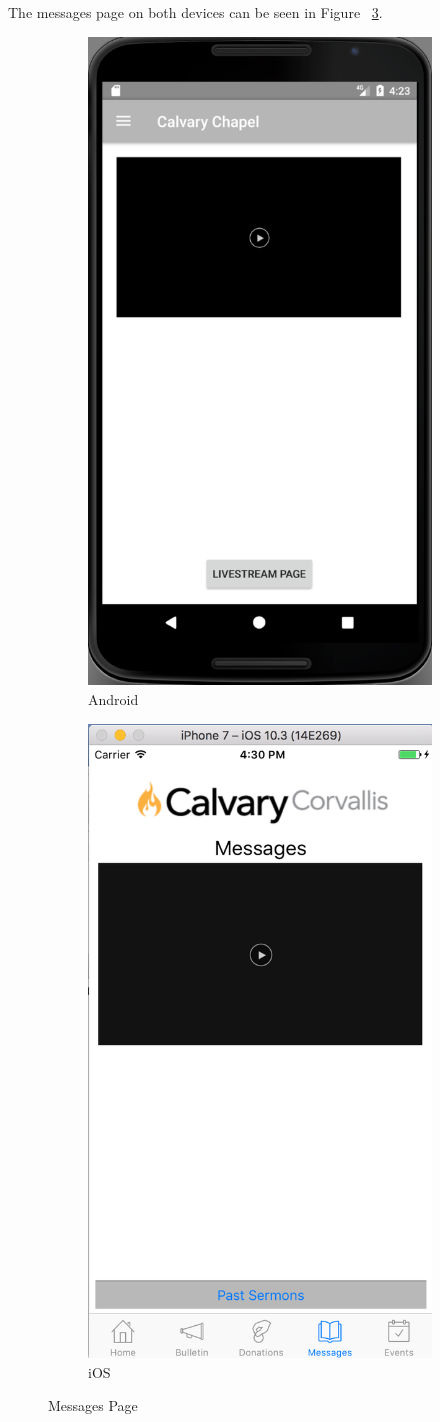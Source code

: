\documentclass[letterpaper,10pt,draftclsnofoot,onecolumn,titlepage]{IEEEtran}
\begin{document}
		The messages page on both devices can be seen in Figure ~\ref{fig:message}.
		
		\begin{figure}[H]
			\centering
			\begin{subfigure}{.5\textwidth}
 				 \centering
  				 \includegraphics[width=.4\linewidth]{androidmessages}
 				 \caption{Android}
  				 \label{fig:sub1}
			\end{subfigure}%
			\begin{subfigure}{.5\textwidth}
		         	\centering
 				 \includegraphics[width=.4\linewidth]{iosmessages}
 				 \caption{iOS}
 				 \label{fig:sub2}
			\end{subfigure}
			\caption{Messages Page}
			\label{fig:message}
		\end{figure}
\end{document}
